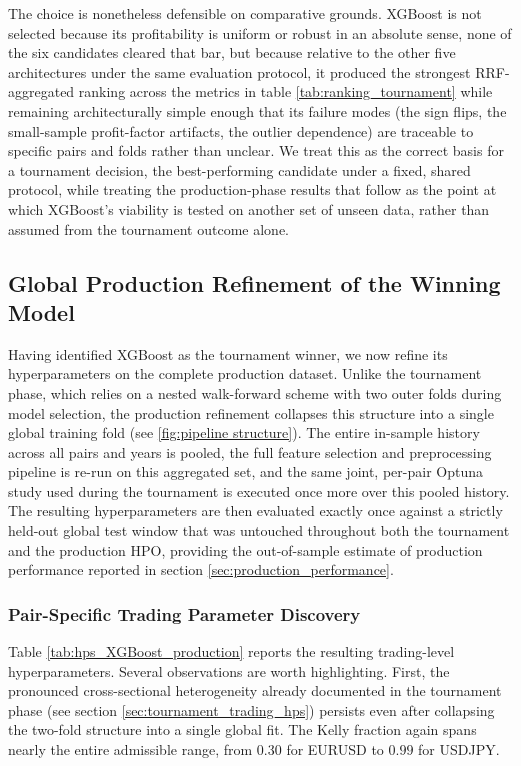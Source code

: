 \documentclass[12pt, a4paper]{article}
\begin{document}
The choice is nonetheless defensible on comparative grounds. XGBoost is not selected because its profitability is uniform or robust in an absolute sense, none of the six 
candidates cleared that bar, but because relative to the other five architectures under the same evaluation protocol, it produced the strongest RRF-aggregated ranking across 
the metrics in table \ref{tab:ranking_tournament} while remaining architecturally simple enough that its failure modes (the sign flips, the small-sample profit-factor 
artifacts, the outlier dependence) are traceable to specific pairs and folds rather than unclear. We treat this as the correct basis for a tournament decision, the best-performing 
candidate under a fixed, shared protocol, while treating the production-phase results that follow as the point at which XGBoost's viability is tested on another set of unseen data, 
rather than assumed from the tournament outcome alone.


\subsection{Global Production Refinement of the Winning Model}
Having identified XGBoost as the tournament winner, we now refine its hyperparameters on the complete production dataset. Unlike the tournament phase, which relies on a nested 
walk-forward scheme with two outer folds during model selection, the production refinement collapses this structure into a single global training fold (see \ref{fig:pipeline structure}). 
The entire in-sample history across all pairs and years is pooled, the full feature selection and preprocessing pipeline is re-run on this aggregated set, and the same joint, 
per-pair Optuna study used during the tournament is executed once more over this pooled history. The resulting hyperparameters are then evaluated exactly once against a strictly 
held-out global test window that was untouched throughout both the tournament and the production HPO, providing the out-of-sample estimate of production performance 
reported in section \ref{sec:production_performance}.

\subsubsection{Pair-Specific Trading Parameter Discovery}



Table \ref{tab:hps_XGBoost_production} reports the resulting trading-level hyperparameters. Several observations are worth highlighting. First, the pronounced cross-sectional 
heterogeneity already documented in the tournament phase (see section \ref{sec:tournament_trading_hps}) persists even after collapsing the two-fold structure into a single global 
fit. The Kelly fraction again spans nearly the entire admissible range, from $0.30$ for EURUSD to $0.99$ for USDJPY.
\end{document}
